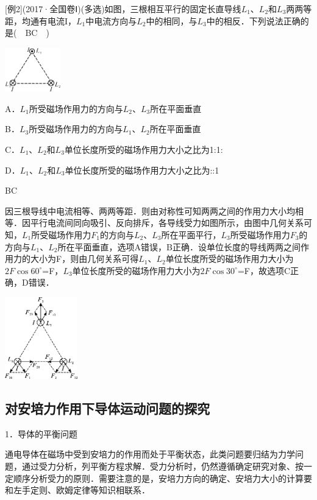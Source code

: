 \documentclass[cn,10.5pt,chinese,mac,chinesefont=founder]{elegantbook}
\begin{document}
{[}例2{]}(2017·全国卷Ⅰ)(多选)如图，三根相互平行的固定长直导线$L_1$、$L_2$和$L_3$两两等距，均通有电流I，$L_1$中电流方向与$L_2$中的相同，与$L_3$中的相反．下列说法正确的是(　BC　)

\begin{center}\includegraphics[width=0.94306in,height=0.75486in]{media/image342.png}\end{center}

A．$L_1$所受磁场作用力的方向与$L_2$、$L_3$所在平面垂直

B．$L_3$所受磁场作用力的方向与$L_1$、$L_2$所在平面垂直

C．$L_1$、$L_2$和$L_3$单位长度所受的磁场作用力大小之比为1:1:

D．$L_1$、$L_2$和$L_3$单位长度所受的磁场作用力大小之比为::1
\begin{solution}
	BC
	
	因三根导线中电流相等、两两等距．则由对称性可知两两之间的作用力大小均相等．因平行电流间同向吸引、反向排斥，各导线受力如图所示，由图中几何关系可知，$L_1$所受磁场作用力$F_1$的方向与$L_2$、$L_3$所在平面平行，$L_3$所受磁场作用力$F_3$的方向与$L_1$、$L_2$所在平面垂直，选项A错误，B正确．设单位长度的导线两两之间作用力的大小为F，则由几何关系可得$L_1$、$L_2$单位长度所受的磁场作用力大小为$2F\cos 60^\circ$=F，$L_3$单位长度所受的磁场作用力大小为$2F\cos 30^\circ$=F，故选项C正确，D错误．
\end{solution}

\begin{center}\includegraphics[width=1.23611in,height=1.39653in]{media/image343.png}\end{center}
\subsection{对安培力作用下导体运动问题的探究}

1．导体的平衡问题

通电导体在磁场中受到安培力的作用而处于平衡状态，此类问题要归结为力学问题，通过受力分析，列平衡方程求解．受力分析时，仍然遵循确定研究对象、按一定顺序分析受力的原则．需要注意的是，安培力方向的确定、安培力大小的计算要和左手定则、欧姆定律等知识相联系．
\end{document}
